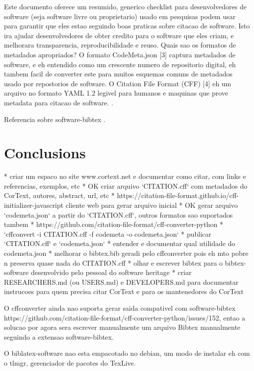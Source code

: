 \documentclass{article}
\begin{document}
Este documento oferece um resumido, generico checklist para desenvolvedores de software
(seja software livre ou proprietario) usado em pesquisas podem usar para garantir que eles
estao seguindo boas praticas sobre citacao de software. Isto ira ajudar desenvolvedores de
obter credito para o software que eles criam, e melhorara transparencia, reproducibilidade
e reuso.
Quais sao os formatos de metadados apropriados?
O formato CodeMeta.json [3]  captura metadados de software, e eh entendido como um crescente
numero de repositorio digital, eh tambem facil de converter este para muitos esquemas
comuns de metadados usado por repostorios de software.
O Citation File Format (CFF) [4] eh um arquivo no formato YAML 1.2 legivel para humanos e
maquinas que prove metadata para citacao de software.
\cite{chue_hong_software_2019}.

Referencia sobre software-bibtex \cite{softwareheritageorg_citing_2020}.

\section{Conclusions}

* criar um espaco no site www.cortext.net e documentar como citar, com links e referencias, exemplos, etc
* OK criar arquivo `CITATION.cff` com metadados do CorText, autores, abstract, url, etc
  * https://citation-file-format.github.io/cff-initializer-javascript cliente web para gerar arquivo inicial
* OK gerar arquivo `codemeta.json` a partir do `CITATION.cff`, outros formatos sao suportados tambem
  * https://github.com/citation-file-format/cff-converter-python
  * `cffconvert -i CITATION.cff -f codemeta -o codemeta.json`
* publicar `CITATION.cff` e `codemeta.json`
* entender e documentar qual utilidade do codemeta.json
* melhorar o bibtex.bib geradi pelo cffconverter pois eh mto pobre n preserva quase nada do CITATION.cff
* olhar e escrever bibtex para o bibtex-software desenvolvido pelo pessoal do software heritage
* criar RESEARCHERS.md (ou USERS.md) e DEVELOPERS.md para documentar instrucoes para quem precisa citar CorText e para os mantenedores do CorText

O cffconverter ainda nao suporta gerar saida compativel com software-bibtex https://github.com/citation-file-format/cff-converter-python/issues/152,
entao a solucao por agora sera escrever manualmente um arquivo Bibtex manualmente seguindo a extensao software-bibtex.

O biblatex-software nao esta empacotado no debian, um modo de instalar eh com o tlmgr, gerenciador
de pacotes do TexLive.
\end{document}
